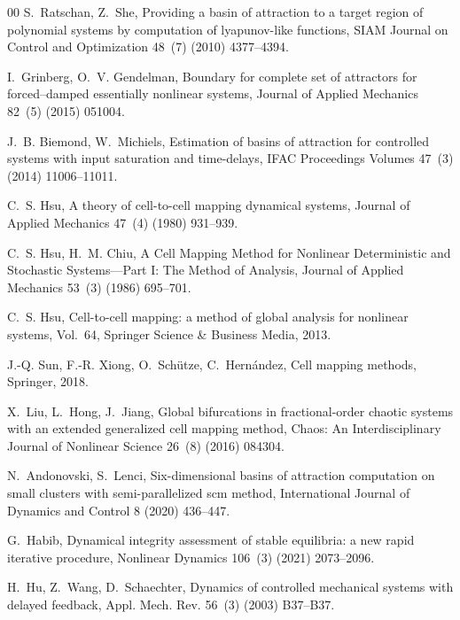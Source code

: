 \documentclass[preprint,12pt]{elsarticle}
\begin{document}
\begin{thebibliography}{00}
		S.~Ratschan, Z.~She, Providing a basin of attraction to a target region of
		polynomial systems by computation of lyapunov-like functions, SIAM Journal on
		Control and Optimization 48~(7) (2010) 4377--4394.
		
		I.~Grinberg, O.~V. Gendelman, Boundary for complete set of attractors for
		forced--damped essentially nonlinear systems, Journal of Applied Mechanics
		82~(5) (2015) 051004.
		
		J.~B. Biemond, W.~Michiels, Estimation of basins of attraction for controlled
		systems with input saturation and time-delays, IFAC Proceedings Volumes
		47~(3) (2014) 11006--11011.
		
		C.~S. Hsu, A theory of cell-to-cell mapping dynamical systems, Journal of
		Applied Mechanics 47~(4) (1980) 931--939.
		
		C.~S. Hsu, H.~M. Chiu, {A Cell Mapping Method for Nonlinear Deterministic and
			Stochastic Systems—Part I: The Method of Analysis}, Journal of Applied
		Mechanics 53~(3) (1986) 695--701.
		
		C.~S. Hsu, Cell-to-cell mapping: a method of global analysis for nonlinear
		systems, Vol.~64, Springer Science \& Business Media, 2013.
		
		J.-Q. Sun, F.-R. Xiong, O.~Sch{\"u}tze, C.~Hern{\'a}ndez, Cell mapping methods,
		Springer, 2018.
		
		X.~Liu, L.~Hong, J.~Jiang, Global bifurcations in fractional-order chaotic
		systems with an extended generalized cell mapping method, Chaos: An
		Interdisciplinary Journal of Nonlinear Science 26~(8) (2016) 084304.
		
		N.~Andonovski, S.~Lenci, Six-dimensional basins of attraction computation on
		small clusters with semi-parallelized scm method, International Journal of
		Dynamics and Control 8 (2020) 436--447.
		
		G.~Habib, Dynamical integrity assessment of stable equilibria: a new rapid
		iterative procedure, Nonlinear Dynamics 106~(3) (2021) 2073--2096.
		
		H.~Hu, Z.~Wang, D.~Schaechter, Dynamics of controlled mechanical systems with
		delayed feedback, Appl. Mech. Rev. 56~(3) (2003) B37--B37.
		

\end{thebibliography}
\end{document}
